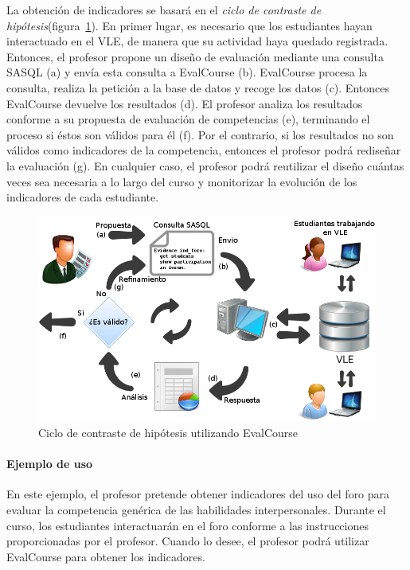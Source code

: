 La obtención de indicadores se basará en el \emph{ciclo de contraste de hipótesis}(figura~\ref{fig:EVCDiagram}). En primer lugar, es necesario que los estudiantes hayan interactuado en el VLE, de manera que su actividad haya quedado registrada. Entonces, el profesor propone un diseño de evaluación mediante una consulta SASQL (a) y envía esta consulta a EvalCourse (b). EvalCourse procesa la consulta, realiza la petición a la base de datos y recoge los datos (c). Entonces EvalCourse devuelve los resultados (d). El profesor analiza los resultados conforme a su propuesta de evaluación de competencias (e), terminando el proceso si éstos son válidos para él (f). Por el contrario, si los resultados no son válidos como indicadores de la competencia, entonces el profesor podrá rediseñar la evaluación (g). En cualquier caso, el profesor podrá reutilizar el diseño cuántas veces sea necesaria a lo largo del curso y monitorizar la evolución de los indicadores de cada estudiante.

\begin{figure}
  \begin{center}
    \includegraphics[scale=0.45]{EvcDiagram.png}
  \end{center}
  \caption{Ciclo de contraste de hipótesis utilizando EvalCourse}
  \label{fig:EVCDiagram}
\end{figure}

\paragraph*{Ejemplo de uso}

En este ejemplo, el profesor pretende obtener indicadores del uso del foro para evaluar la competencia genérica de las habilidades interpersonales. Durante el curso, los estudiantes interactuarán en el foro conforme a las instrucciones proporcionadas por el profesor. Cuando lo desee, el profesor podrá utilizar EvalCourse para obtener los indicadores.

